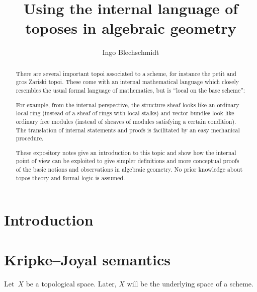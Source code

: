 \documentclass[10pt]{amsart}
\title{Using the internal language of toposes in algebraic geometry}
\author{Ingo Blechschmidt}
\theoremstyle{definition}
\theoremstyle{plain}
\theoremstyle{remark}
\newcommand{\?}{\,{:}\,}
\renewcommand{\_}{\mathpunct{.}\,}
\begin{document}
\maketitle

\begin{abstract}
  There are several important topoi associated to a scheme, for instance the
  petit and gros Zariski topoi. These come with an internal mathematical language
  which closely resembles the usual formal language of mathematics, but is ``local
  on the base scheme'':

  For example, from the internal perspective, the structure sheaf looks like an
  ordinary local ring (instead of a sheaf of rings with local stalks) and vector
  bundles look like ordinary free modules (instead of sheaves of modules
  satisfying a certain condition). The translation of internal statements and
  proofs is facilitated by an easy mechanical procedure.

  These expository notes give an introduction to this topic and show how the internal
  point of view can be exploited to give simpler definitions and more conceptual
  proofs of the basic notions and observations in algebraic geometry. No prior
  knowledge about topos theory and formal logic is assumed.
\end{abstract}

\tableofcontents

\section{Introduction}

\section{Kripke--Joyal semantics}

Let~$X$ be a topological space. Later, $X$ will be the underlying space of a
scheme.
\end{document}

